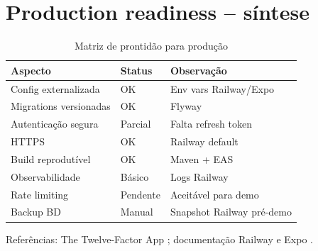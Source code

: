 \section{Production readiness -- síntese}

\begin{table}[htbp]
    \caption{Matriz de prontidão para produção}
    \label{tab:production-readiness}
    \centering
    \footnotesize
    \begin{tabular}{p{3.5cm} p{2cm} p{7cm}}
        \toprule
        \textbf{Aspecto} & \textbf{Status} & \textbf{Observação} \\
        \midrule
        Config externalizada & OK & Env vars Railway/Expo \\
        Migrations versionadas & OK & Flyway \\
        Autenticação segura & Parcial & Falta refresh token \\
        HTTPS & OK & Railway default \\
        Build reprodutível & OK & Maven + EAS \\
        Observabilidade & Básico & Logs Railway \\
        Rate limiting & Pendente & Aceitável para demo \\
        Backup BD & Manual & Snapshot Railway pré-demo \\
        \bottomrule
    \end{tabular}
\end{table}

Referências: The Twelve-Factor App \cite{twelve_factor}; documentação Railway e Expo \cite{railway_docs,expo_eas_build}.
